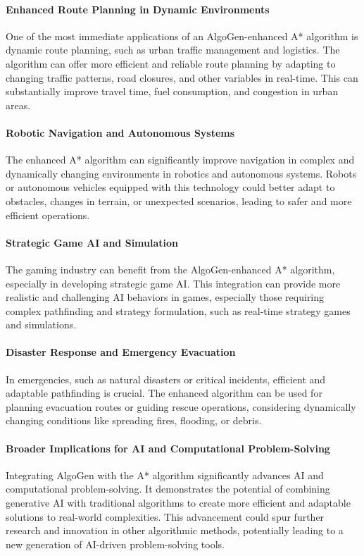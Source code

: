 \documentclass{article}
\begin{document}
\paragraph{Enhanced Route Planning in Dynamic Environments}
One of the most immediate applications of an AlgoGen-enhanced A* algorithm is dynamic route planning, such as urban traffic management and logistics. The algorithm can offer more efficient and reliable route planning by adapting to changing traffic patterns, road closures, and other variables in real-time. This can substantially improve travel time, fuel consumption, and congestion in urban areas.

\paragraph{Robotic Navigation and Autonomous Systems}
The enhanced A* algorithm can significantly improve navigation in complex and dynamically changing environments in robotics and autonomous systems. Robots or autonomous vehicles equipped with this technology could better adapt to obstacles, changes in terrain, or unexpected scenarios, leading to safer and more efficient operations.

\paragraph{Strategic Game AI and Simulation}
The gaming industry can benefit from the AlgoGen-enhanced A* algorithm, especially in developing strategic game AI. This integration can provide more realistic and challenging AI behaviors in games, especially those requiring complex pathfinding and strategy formulation, such as real-time strategy games and simulations.

\paragraph{Disaster Response and Emergency Evacuation}
In emergencies, such as natural disasters or critical incidents, efficient and adaptable pathfinding is crucial. The enhanced algorithm can be used for planning evacuation routes or guiding rescue operations, considering dynamically changing conditions like spreading fires, flooding, or debris.

\paragraph{Broader Implications for AI and Computational Problem-Solving}
Integrating AlgoGen with the A* algorithm significantly advances AI and computational problem-solving. It demonstrates the potential of combining generative AI with traditional algorithms to create more efficient and adaptable solutions to real-world complexities. This advancement could spur further research and innovation in other algorithmic methods, potentially leading to a new generation of AI-driven problem-solving tools.
\end{document}
